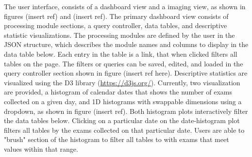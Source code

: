 The user interface, consists of a dashboard view and a imaging view, as shown in figures (insert ref) and (insert ref). The primary dashboard view consists of processing module sections, a query controller, data tables, and descriptive statistic visualizations. The processing modules are defined by the user in the JSON structure, which describes the module names and columns to display in the data table below. Each entry in the table is a link, that when clicked filters all tables on the page. The filters or queries can be saved, edited, and loaded in the query controller section shown in figure (insert ref here). Descriptive statistics are visualized using the D3 library (\href{https://d3js.org/}{https://d3js.org/}). Currently, two visualization are provided, a histogram of calendar dates that shows the number of exams collected on a given day, and 1D histograms with swappable dimensions using a dropdown, as shown in figure (insert ref). Both histogram plots interactively filter the data tables below. Clicking on a particular date on the date-histogram plot filters all tables by the exams collected on that particular date. Users are able to "brush" section of the histogram to filter all tables to with exams that meet values within that range.  
